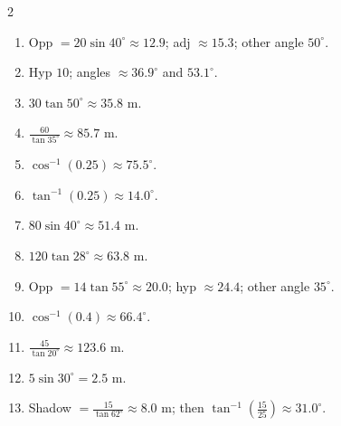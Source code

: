 \documentclass[11pt]{article}
\begin{document}
\begin{keybox}
\begin{multicols}{2}
\small
\begin{enumerate}[leftmargin=*,itemsep=3pt]
  \item Opp $=20\sin40^\circ\approx12.9$; adj $\approx15.3$; other angle $50^\circ$.
  \item Hyp $10$; angles $\approx36.9^\circ$ and $53.1^\circ$.
  \item $30\tan50^\circ\approx35.8$ m.
  \item $\tfrac{60}{\tan35^\circ}\approx85.7$ m.
  \item $\cos^{-1}(0.25)\approx75.5^\circ$.
  \item $\tan^{-1}(0.25)\approx14.0^\circ$.
  \item $80\sin40^\circ\approx51.4$ m.
  \item $120\tan28^\circ\approx63.8$ m.
  \item Opp $=14\tan55^\circ\approx20.0$; hyp $\approx24.4$; other angle $35^\circ$.
  \item $\cos^{-1}(0.4)\approx66.4^\circ$.
  \item $\tfrac{45}{\tan20^\circ}\approx123.6$ m.
  \item $5\sin30^\circ=2.5$ m.
  \item Shadow $=\tfrac{15}{\tan62^\circ}\approx8.0$ m; then $\tan^{-1}(\tfrac{15}{25})\approx31.0^\circ$.
\end{enumerate}
\end{multicols}
\end{keybox}
\end{document}
